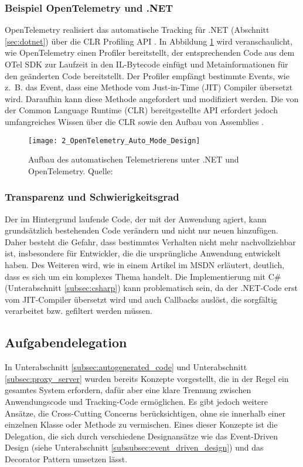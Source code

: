 \subsubsection{Beispiel OpenTelemetry und .NET}
OpenTelemetry realisiert das automatische Tracking für .NET (Abschnitt \ref{sec:dotnet}) über die CLR Profiling API \cite{microsoft2025profiling}. In Abbildung \ref{fig:opentelemetry_design} wird veranschaulicht, wie OpenTelemetry einen Profiler bereitstellt, der entsprechenden Code aus dem OTel SDK zur Laufzeit in den IL-Bytecode einfügt und Metainformationen für den geänderten Code bereitstellt. Der Profiler empfängt bestimmte Events, wie z.~B. das Event, dass eine Methode vom Just-in-Time (JIT) Compiler übersetzt wird. Daraufhin kann diese Methode angefordert und modifiziert werden. Die von der Common Language Runtime (CLR) bereitgestellte API erfordert jedoch umfangreiches Wissen über die CLR sowie den Aufbau von Assemblies \cite{Mikunov2003}.

\begin{figure}[H]
\centering
\texttt{[image: 2\_OpenTelemetry\_Auto\_Mode\_Design]}
\caption{Aufbau des automatischen Telemetrierens unter .NET und OpenTelemetry. Quelle: \cite{otel-dotnet-instrumentation-design}}
\label{fig:opentelemetry_design}
\end{figure}

\subsubsection{Transparenz und Schwierigkeitsgrad}
Der im Hintergrund laufende Code, der mit der Anwendung agiert, kann grundsätzlich bestehenden Code verändern und nicht nur neuen hinzufügen. Daher besteht die Gefahr, dass bestimmtes Verhalten nicht mehr nachvollziehbar ist, insbesondere für Entwickler, die die ursprüngliche Anwendung entwickelt haben. Des Weiteren wird, wie in einem Artikel \cite{Mikunov2003} im MSDN erläutert, deutlich, dass es sich um ein komplexes Thema handelt. Die Implementierung mit C\# (Unterabschnitt \ref{subsec:csharp}) kann problematisch sein, da der .NET-Code erst vom JIT-Compiler übersetzt wird und auch Callbacks auslöst, die sorgfältig verarbeitet bzw. gefiltert werden müssen.

\subsection{Aufgabendelegation}
\label{subsec:task_delegation}
In Unterabschnitt \ref{subsec:autogenerated_code} und Unterabschnitt \ref{subsec:proxy_server} wurden bereits Konzepte vorgestellt, die in der Regel ein gesamtes System erfordern, dafür aber eine klare Trennung zwischen Anwendungscode und Tracking-Code ermöglichen.  
Es gibt jedoch weitere Ansätze, die Cross-Cutting Concerns \cite{crosscutting} berücksichtigen, ohne sie innerhalb einer einzelnen Klasse oder Methode zu vermischen.  
Eines dieser Konzepte ist die Delegation, die sich durch verschiedene Designansätze wie das Event-Driven Design (siehe Unterabschnitt \ref{subsubsec:event_driven_design}) und das Decorator Pattern umsetzen lässt.

